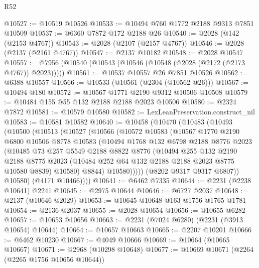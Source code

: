 \begin{lexlean}{R52}
\begin{coremodule}
@10527 := @10519 @10526
@10533 := @10494 @760 @1772 @2188 @9313 @7851 @10509
@10537 := @6360 @7872 @172 @2188 @26
@10540 := @2028 (@142 (@2153 @4767))
@10543 := @2028 (@2107 (@2157 @4767))
@10546 := @2028 (@2137 (@2161 @4767))
@10547 := @2137 @10182
@10548 := @2028 @10547
@10557 := @7956 (@10540 (@10543 (@10546 (@10548 (@2028 (@2172 (@2173 @4767)) @2023)))))
@10561 := @10537 @10557 @26 @7851 @10526
@10562 := @6388 @10557
@10566 := @10533 (@10561 (@2304 (@10562 @26)))
@10567 := @10494 @180
@10572 := @10567 @1771 @2190 @9312 @10506 @10508
@10579 := @10484 @155 @55 @132 @2188 @2188 @2023 @10506
@10580 := @2324 @7872
@10581 := @10579 @10580
@10582 := LexLeanPreservation.construct_nil
@10583 := @10581 @10582
@10640 := @10458
    (@10470
      (@10483
        (@10493
          (@10500
            (@10513
              (@10527
                (@10566
                  (@10572
                    @10583
                    (@10567
                      @1770
                      @2190
                      @6800
                      @10506
                      @8778
                      @10583
                      (@10494
                        @1768
                        @132
                        @6798
                        @2188
                        @8776
                        @2023
                        (@10485
                          @73
                          @257
                          @5549
                          @2188
                          @8822
                          @8776
                          (@10494
                            @255
                            @132
                            @2190
                            @2188
                            @8775
                            @2023
                            (@10484 @252 @64 @132 @2188 @2188 @2023 @8775 @10580 @8839)
                            @10580)
                          @8844)
                        @10580)))))
              (@8202 @9317 @9317 @6807))
            @10580)
          (@4171 @10466))))
@10641 := @6462 @7335
@10644 := @2231 (@2238 @10641) @2241
@10645 := @2975 @10644
@10646 := @6727 @2037
@10648 := @2137 (@10646 @2029)
@10653 := @10645 @10648 @163 @1756 @1765 @1781
@10654 := @2136 @2037
@10655 := @2028 @10654
@10656 := @10655 @6282
@10657 := @10653 @10656
@10663 := @2231 (@7024 @6280) (@2231 (@3913 @10654) @10644)
@10664 := @10657 @10663
@10665 := @2207 @10201
@10666 := @6462 @10230
@10667 := @4049 @10666
@10669 := @10664 (@10665 @10667)
@10671 := @2968 (@10298 @10648)
@10677 := @10669 @10671 (@2264 (@2265 @1756 @10656 @10644))

\end{coremodule}
\end{lexlean}
